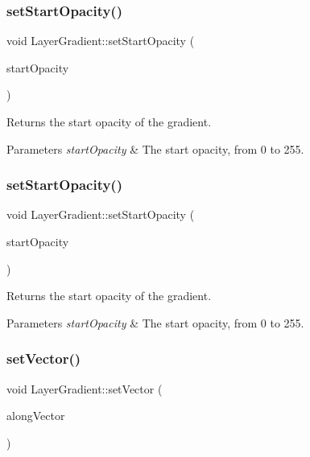 \subsubsection{\texorpdfstring{set\+Start\+Opacity()}{setStartOpacity()}\hspace{0.1cm}{\footnotesize\ttfamily [1/2]}}
{\footnotesize\ttfamily void Layer\+Gradient\+::set\+Start\+Opacity (\begin{DoxyParamCaption}\item[{G\+Lubyte}]{start\+Opacity }\end{DoxyParamCaption})}

Returns the start opacity of the gradient.


\begin{DoxyParams}{Parameters}
{\em start\+Opacity} & The start opacity, from 0 to 255. \\
\hline
\end{DoxyParams}
\mbox{\label{classLayerGradient_a435d90e278ecd977feb7f0057572ed1d}} 
\subsubsection{\texorpdfstring{set\+Start\+Opacity()}{setStartOpacity()}\hspace{0.1cm}{\footnotesize\ttfamily [2/2]}}
{\footnotesize\ttfamily void Layer\+Gradient\+::set\+Start\+Opacity (\begin{DoxyParamCaption}\item[{G\+Lubyte}]{start\+Opacity }\end{DoxyParamCaption})}

Returns the start opacity of the gradient.


\begin{DoxyParams}{Parameters}
{\em start\+Opacity} & The start opacity, from 0 to 255. \\
\hline
\end{DoxyParams}
\mbox{\label{classLayerGradient_aefd1b00ca1d723c736bdb7a2ff4a802b}} 
\subsubsection{\texorpdfstring{set\+Vector()}{setVector()}\hspace{0.1cm}{\footnotesize\ttfamily [1/2]}}
{\footnotesize\ttfamily void Layer\+Gradient\+::set\+Vector (\begin{DoxyParamCaption}\item[{const \hyperlink{classVec2}{Vec2} \&}]{along\+Vector }\end{DoxyParamCaption})}


